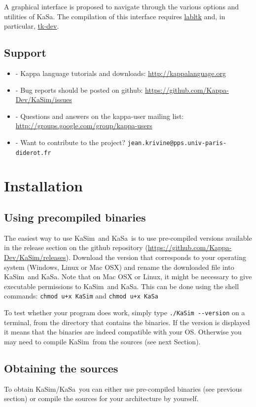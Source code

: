 \documentclass[11pt]{book}
\def\KaSim{\textsf{KaSim}}
\def\KaSa{\textsf{KaSa}}
\def\ttt#1{\texttt{#1}}
\def\ITE#1{\begin{itemize}#1\end{itemize}}
\def\dd{-\hspace{0.001cm}-}
\begin{document}
A graphical interface is proposed to navigate through the various options and utilities  of \KaSa. The compilation of this interface requires \href{https://forge.ocamlcore.org/projects/labltk/}{labltk} and, in particular,  \href{http://www.tcl.tk/}{tk-dev}.


\section{Support}
\ITE{
\item[-] Kappa language tutorials and downloads: \url{http://kappalanguage.org}
\item[-] Bug reports should be posted on github: \url{https://github.com/Kappa-Dev/KaSim/issues}
\item[-] Questions and answers on the kappa-user mailing list: \url{http://groups.google.com/group/kappa-users}
\item[-] Want to contribute to the project? \ttt{jean.krivine@pps.univ-paris-diderot.fr}
}

\chapter{Installation}\label{chap:install}

\section{Using precompiled binaries}
The easiest way to use \KaSim~and \KaSa~is to use pre-compiled versions available in the release section on the github repository (\url{https://github.com/Kappa-Dev/KaSim/releases}). Download the version that corresponds to your operating system (Windows, Linux or Mac OSX) and rename the downloaded file into \KaSim~and \KaSa. Note that on Mac OSX or Linux, it might be necessary to give executable permissions to \KaSim~and \KaSa. This can be done using the shell commands:
\ttt{chmod u+x KaSim} and \ttt{chmod u+x KaSa}

To test whether your program does work, simply type \ttt{./KaSim \dd version} on a terminal, from the directory that contains the binaries. If the version is displayed it means that the binaries are indeed compatible with your OS. Otherwise you may need to compile \KaSim~from the sources (see next Section).

\section{Obtaining the sources}\label{sec:sources}
To obtain \KaSim/\KaSa~you can either use pre-compiled binaries (see
previous section) or compile the sources for your
architecture by yourself.
\end{document}
